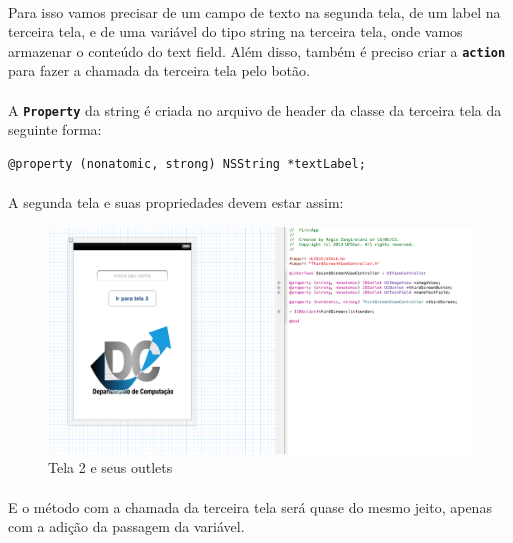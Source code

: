 \documentclass[a4paper,12pt,brazil,doubleside]{book}
\begin{document}
\paragraph{}Para isso vamos precisar de um campo de texto na segunda tela, de um label na terceira tela, e de uma variável do tipo string na terceira tela, onde vamos armazenar o conteúdo do text field. Além disso, também é preciso criar a \texttt{\textbf{action}} para fazer a chamada da terceira tela pelo botão.
\paragraph{}A \texttt{\textbf{Property}} da string é criada no arquivo de header da classe da terceira tela da seguinte forma:

\begin{listing}
\begin{verbatim}
@property (nonatomic, strong) NSString *textLabel;
\end{verbatim}
\end{listing}

\paragraph{}A segunda tela e suas propriedades devem estar assim:

\begin{figure}[h]
  \centering
  \includegraphics[totalheight=0.3\textheight]{../figuras/ios/2/xib_tela2_header.png}
  \caption{Tela 2 e seus outlets}
  \label{fig:a}
\end{figure}

\bigskip
\bigskip

\paragraph{}E o método com a chamada da terceira tela será quase do mesmo jeito, apenas com a adição da passagem da variável.
\end{document}
